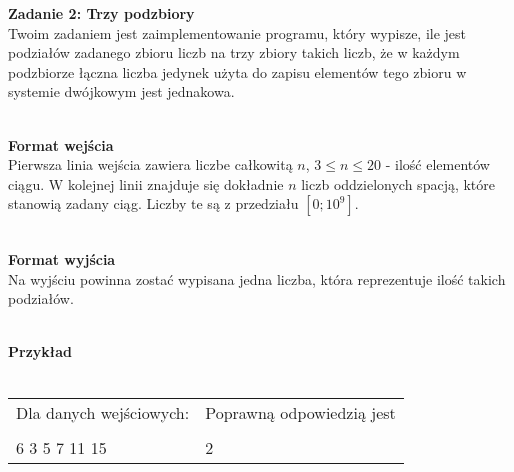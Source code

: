 \documentclass[
fontsize=12pt %
,english %
,headinclude %
,headsepline %
]{scrbook} %
\begin{document}
\vspace{50 mm}
\hspace{50 mm}
\newline
\par{\Large \textbf{Zadanie 2: Trzy podzbiory}} \\ \newline
Twoim zadaniem jest zaimplementowanie programu, który wypisze, ile jest podziałów zadanego zbioru 
liczb na trzy zbiory takich liczb, że w każdym podzbiorze łączna liczba jedynek użyta do zapisu elementów tego zbioru
w systemie dwójkowym jest jednakowa.
\\ \\
\par{\Large \textbf{Format wejścia}} \\ \newline
Pierwsza linia wejścia zawiera liczbe całkowitą $n$, $3 \leq n \leq 20$ - ilość elementów ciągu. W kolejnej linii znajduje się dokładnie $n$ liczb oddzielonych spacją, które stanowią zadany ciąg. Liczby te są z przedziału $[0; 10^9]$.
\\ \\
\par{\Large \textbf{Format wyjścia}} \\ \newline
Na wyjściu powinna zostać wypisana jedna liczba, która reprezentuje ilość takich podziałów.
\\ \\
\par{\Large \textbf{Przykład}} \\ \\
\begin{tabular}{ p{7cm} p{7cm} }
Dla danych wejściowych: \hspace{40mm}& Poprawną odpowiedzią jest \\
& \\
6 \newline
2 3 5 7 11 15 \newline
&
2 \newline
\\
\end{tabular}
\end{document}
